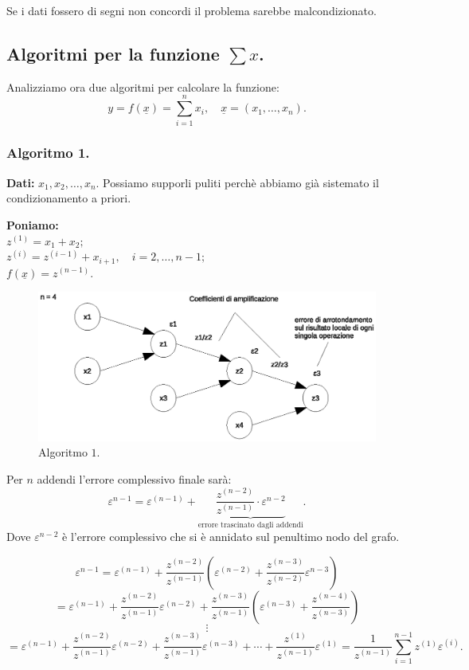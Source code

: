 Se i dati fossero di segni non concordi il problema sarebbe malcondizionato.

\subsection{Algoritmi per la funzione $\sum x$.}
Analizziamo ora due algoritmi per calcolare la funzione:
\[y = f(\underline{x}) = \sum_{i=1}^nx_i, 
\quad \underline{x} = (x_1, \ldots, x_n).\]

\subsubsection{Algoritmo 1.}
\textbf{Dati:} $x_1, x_2, \ldots, x_n$. Possiamo supporli puliti perchè 
abbiamo già sistemato il condizionamento a priori.
\begin{flushleft}\samepage
\textbf{Poniamo:}\\
$z^{(1)} = x_1 + x_2;$\\
$z^{(i)} = z^{(i-1)} + x_{i+1}, \quad i = 2, \ldots, n-1;$\\
$f(\underline{x}) = z^{(n-1)}.$
\begin{figure}[!ht]
\includegraphics{fig/algoritmo1.eps}
\caption{Algoritmo $1$.}
\end{figure}
\end{flushleft}
Per $n$ addendi l'errore complessivo finale sarà:
\[
\varepsilon^{n-1}= \varepsilon^{(n-1)} + \underbrace{\frac{z^{(n-2)}}{z^{(n-1)}}
\cdot\varepsilon^{n-2}}_{\textrm{errore trascinato dagli addendi}}.
\]
Dove $\varepsilon^{n-2}$ è l'errore complessivo che si è annidato sul 
penultimo nodo del grafo.

\[\varepsilon^{n-1}=\varepsilon^{(n-1)} + \frac{z^{(n-2)}}{z^{(n-1)}} \left(
\varepsilon^{(n-2)} +\frac{z^{(n-3)}}{z^{(n-2)}}\varepsilon^{n-3} \right)\]
\[= \varepsilon^{(n-1)} + \frac{z^{(n-2)}}{z^{(n-1)}}\varepsilon^{(n-2)} +
\frac{z^{(n-3)}}{z^{(n-1)}}\left(\varepsilon^{(n-3)} + \frac{z^{(n-4)}}{z^{(n-3)}}
\right)\]
\[\vdots\]
\[= \varepsilon^{(n-1)} + \frac{z^{(n-2)}}{z^{(n-1)}}\varepsilon^{(n-2)} +
\frac{z^{(n-3)}}{z^{(n-1)}}\varepsilon^{(n-3)} + \cdots + \frac{z^{(1)}}{z^{(n-1)}}
\varepsilon^{(1)} = \frac{1}{z^{(n-1)}}\sum_{i=1}^{n-1}z^{(1)}\varepsilon^{(i)}.
\]

